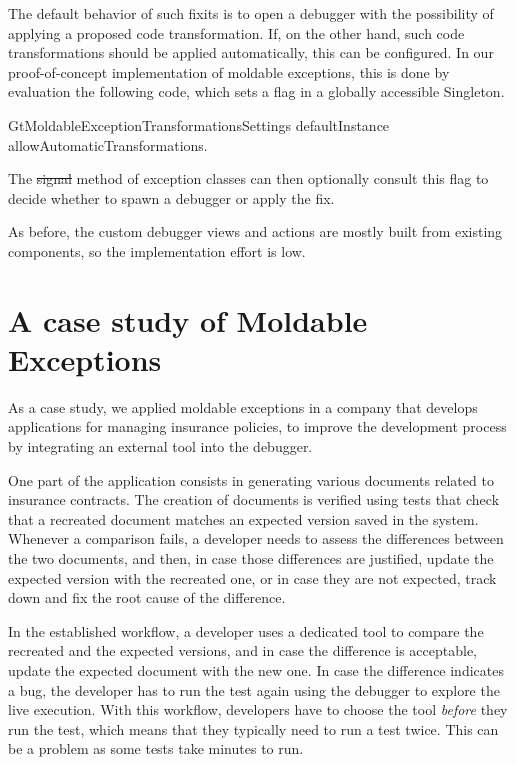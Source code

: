 \documentclass[sigplan,anonymous,review,10pt]{acmart}
\newcommand\ac[1]{\nbc{AC}{#1}{teal}}
\begin{document}
The default behavior of such fixits is to open a debugger with the possibility of applying a proposed code transformation.
If, on the other hand, such code transformations should be applied automatically, this can be configured.
In our proof-of-concept implementation of moldable exceptions, this is done by evaluation the following code, which sets a flag in a globally accessible Singleton.
\begin{code}
GtMoldableExceptionTransformationsSettings defaultInstance allowAutomaticTransformations.
\end{code}
The \st{signal} method of exception classes can then optionally consult this flag to decide whether to spawn a debugger or apply the fix.

As before, the custom debugger views and actions are mostly built from existing components, so the implementation effort is low.

\section{A case study of Moldable Exceptions}\label{sec:casestudy}

As a case study, we applied moldable exceptions in a company that develops applications for managing insurance policies, to improve the development process by integrating an external tool into the debugger. 

One part of the application consists in generating various documents related to insurance contracts. 
The creation of documents is verified using tests that check that a recreated document matches an expected version saved in the system.
Whenever a comparison fails, a developer needs to assess the differences between the two documents, and then, in case those differences are justified, update the expected version with the recreated one, or in case they are not expected, track down and fix the root cause of the difference.

In the established workflow, a developer uses a dedicated tool to compare the recreated and the expected versions, and in case the difference is acceptable, update the expected document with the new one. 
In case the difference indicates a bug, the developer has to run the test again using the debugger to explore the live execution.
With this workflow, developers have to choose the tool \emph{before} they run the test, which means that they typically need to run a test twice. 
This can be a problem as some tests take minutes to run.
\end{document}
